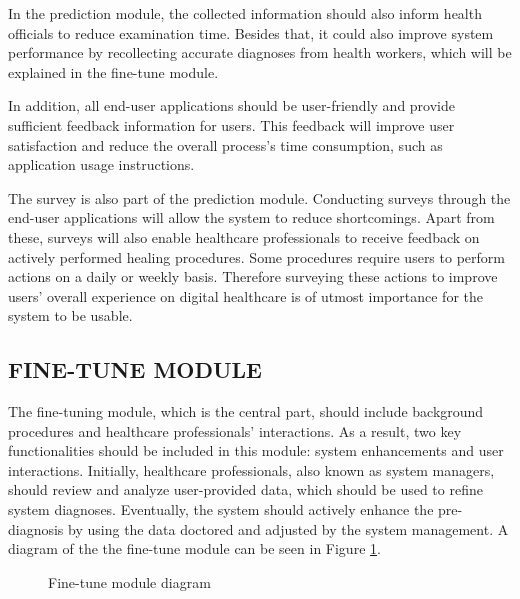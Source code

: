 In the prediction module, the collected information should also inform health officials to reduce examination time. Besides that, it could also improve system performance by recollecting accurate diagnoses from health workers, which will be explained in the fine-tune module.

In addition, all end-user applications should be user-friendly and provide sufficient feedback information for users. This feedback will improve user satisfaction and reduce the overall process's time consumption, such as application usage instructions.

The survey is also part of the prediction module. Conducting surveys through the end-user applications will allow the system to reduce shortcomings. Apart from these, surveys will also enable healthcare professionals to receive feedback on actively performed healing procedures. Some procedures require users to perform actions on a daily or weekly basis. Therefore surveying these actions to improve users' overall experience on digital healthcare is of utmost importance for the system to be usable.

\subsection{ FINE-TUNE MODULE }

The fine-tuning module, which is the central part, should include background procedures and healthcare professionals' interactions. As a result, two key functionalities should be included in this module: system enhancements and user interactions. Initially, healthcare professionals, also known as system managers, should review and analyze user-provided data, which should be used to refine system diagnoses. Eventually, the system should actively enhance the pre-diagnosis by using the data doctored and adjusted by the system management. A diagram of the the fine-tune module can be seen in Figure \ref{fig:FineTuneModuleDiagram}.


\begin{figure}[htbp]
\centering
{}
\caption{Fine-tune module diagram}
\label{fig:FineTuneModuleDiagram}
\end{figure}

